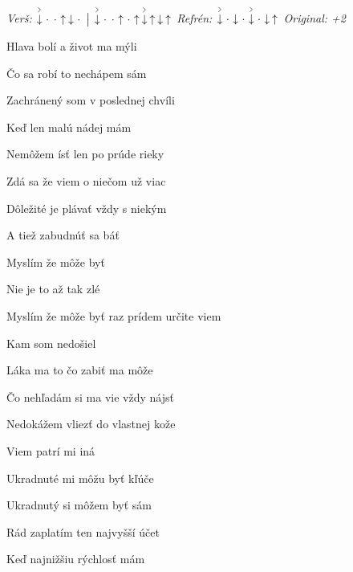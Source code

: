 \begin{song}


\textit{Verš:} $\AccentDown\Miss\Miss\Up\Down\Miss \Separator \AccentDown\Miss\Miss\Up\Miss\Up\AccentDown\Up\Down\Up$ \quad
\textit{Refrén:} $\AccentDown\Miss\Down\Miss\AccentDown\Miss\Down\Up$ \quad
\textit{Original: +2}

\large


\Large

\bigskip

Hlava bolí a život ma mýli \par
{}Čo sa robí to nechápem sám \par
{}Zachránený som v poslednej chvíli \par
Keď len malú nádej mám \par

\bigskip

Nemôžem ísť len po prúde rieky \par
{}Zdá sa že viem o niečom už viac \par
{}Dôležité je plávať vždy s niekým \par
A tiež zabudnúť sa báť \par

\bigskip

\begin{chorusbox}{\Refren}
Myslím že môže byť   \par
Nie je to až tak zlé    \par
Myslím že môže byť  raz prídem určite viem \par
Kam som nedošiel \par
\end{chorusbox}

\bigskip

Láka ma to čo zabiť ma môže \par
{}Čo nehľadám si ma vie vždy nájsť \par
{}Nedokážem vliezť do vlastnej kože \par
{}Viem patrí mi iná \par

\bigskip

\Refren

\bigskip

Ukradnuté mi môžu byť kľúče \par
{}Ukradnutý si môžem byť sám \par
{}Rád zaplatím ten najvyšší účet \par
Keď najnižšiu rýchlosť mám \par

\bigskip

\Refren

\end{song}